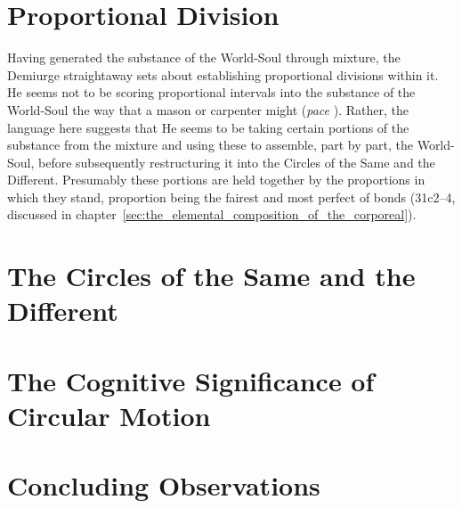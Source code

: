 
\section{Proportional Division} %
\label{sec:proportional_division}

Having generated the substance of the World-Soul through mixture, the Demiurge straightaway sets about establishing proportional divisions within it. He seems not to be scoring proportional intervals into the substance of the World-Soul the way that a mason or carpenter might (\emph{pace} \citealt{Robinson:1970lq}). Rather, the language here suggests that He seems to be taking certain portions of the substance from the mixture and using these to assemble, part by part, the World-Soul, before subsequently restructuring it into the Circles of the Same and the Different. Presumably these portions are held together by the proportions in which they stand, proportion being the fairest and most perfect of bonds (31c2–4, discussed in chapter~\ref{sec:the_elemental_composition_of_the_corporeal}).


\section{The Circles of the Same and the Different} %
\label{sec:the_circles_of_the_same_and_the_different}




\section{The Cognitive Significance of Circular Motion} %
\label{sec:the_cognitive_significance_of_circular_motion}




\section{Concluding Observations} %
\label{sec:concluding_observations_p}




